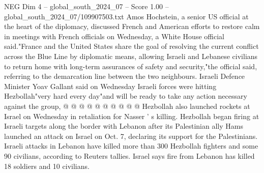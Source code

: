 \begin{textsample}{NEG Dim 4 – global\_south\_2024\_07 – Score 1.00 – global\_south\_2024\_07/109907503.txt}
Amos Hochstein, a senior US official at the heart of the diplomacy, discussed French and American efforts to restore calm in meetings with French officials on Wednesday, a White House official said."France and the United States share the goal of resolving the current conflict across the Blue Line by diplomatic means, allowing Israeli and Lebanese civilians to return home with long-term assurances of safety and security,"the official said, referring to the demarcation line between the two neighbours.
Israeli Defence Minister Yoav Gallant said on Wednesday Israeli forces were hitting Hezbollah"very hard every day"and will be ready to take any action necessary against the group, @ @ @ @ @ @ @ @ @ @ Hezbollah also launched rockets at Israel on Wednesday in retaliation for Nasser ' s killing.
Hezbollah began firing at Israeli targets along the border with Lebanon after its Palestinian ally Hams launched an attack on Israel on Oct. 7, declaring its support for the Palestinians.
Israeli attacks in Lebanon have killed more than 300 Hezbollah fighters and some 90 civilians, according to Reuters tallies.
Israel says fire from Lebanon has killed 18 soldiers and 10 civilians.

\end{textsample}
